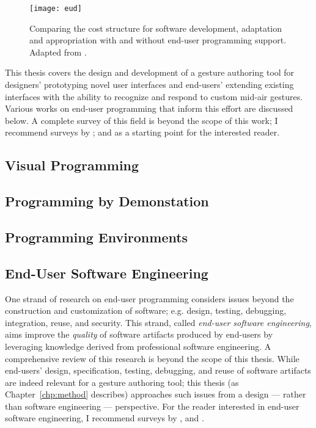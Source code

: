 \begin{SCfigure}[\sidecaptionrelwidth][ht]
\centering
\texttt{[image: eud]}
\caption{Comparing the cost structure for software development, adaptation and appropriation with and without end-user programming support. Adapted from \textcite{Wulf:2004}.}
\label{fig:eud}
\end{SCfigure}

This thesis covers the design and development of a gesture authoring tool for designers' prototyping novel user interfaces and end-users' extending existing interfaces with the ability to recognize and respond to custom mid-air gestures. Various works on end-user programming that inform this effort are discussed below. A complete survey of this field is beyond the scope of this work; I recommend surveys by \textcite{Paterno:2013}; and \textcite{Myers:2006} as a starting point for the interested reader.

\subsection{Visual Programming}

\subsection{Programming by Demonstation}

\subsection{Programming Environments}

\subsection{End-User Software Engineering}

One strand of research on end-user programming considers issues beyond the construction and customization of software; e.g. design, testing, debugging, integration, reuse, and security. This strand, called \emph{end-user software engineering}, aims improve the \emph{quality} of software artifacts produced by end-users by leveraging knowledge derived from professional software engineering. A comprehensive review of this research is beyond the scope of this thesis. While end-users' design, specification, testing, debugging, and reuse of software artifacts are indeed relevant for a gesture authoring tool; this thesis  (as Chapter~\ref{chp:method} describes) approaches such issues from a design --- rather than software engineering --- perspective. For the reader interested in end-user software engineering, I recommend surveys by \textcite{Burnett:2004}, and \textcite{Ko:2011}.

